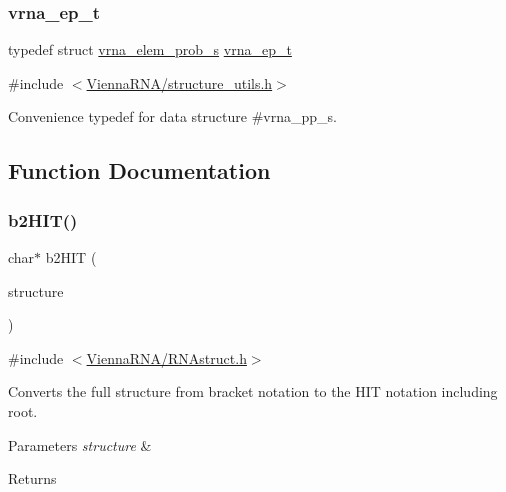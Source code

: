 \subsubsection{\texorpdfstring{vrna\+\_\+ep\+\_\+t}{vrna\_ep\_t}}
{\footnotesize\ttfamily typedef struct \mbox{\hyperlink{group__struct__utils_structvrna__elem__prob__s}{vrna\+\_\+elem\+\_\+prob\+\_\+s}} \mbox{\hyperlink{group__struct__utils_gab9ac98ab55ded9fb90043b024b915aca}{vrna\+\_\+ep\+\_\+t}}}



{\ttfamily \#include $<$\mbox{\hyperlink{structure__utils_8h}{Vienna\+R\+N\+A/structure\+\_\+utils.\+h}}$>$}



Convenience typedef for data structure \#vrna\+\_\+pp\+\_\+s. 



\subsection{Function Documentation}
\mbox{\label{group__struct__utils_ga07b7e90e712559a1992fba3ac6d21bbd}} 
\subsubsection{\texorpdfstring{b2\+H\+I\+T()}{b2HIT()}}
{\footnotesize\ttfamily char$\ast$ b2\+H\+IT (\begin{DoxyParamCaption}\item[{const char $\ast$}]{structure }\end{DoxyParamCaption})}



{\ttfamily \#include $<$\mbox{\hyperlink{_r_n_astruct_8h}{Vienna\+R\+N\+A/\+R\+N\+Astruct.\+h}}$>$}



Converts the full structure from bracket notation to the H\+IT notation including root. 


\begin{DoxyParams}{Parameters}
{\em structure} & \\
\hline
\end{DoxyParams}
\begin{DoxyReturn}{Returns}

\end{DoxyReturn}
\mbox{\label{group__struct__utils_ga9c80d92391f2833549a8b6dac92233f0}} 
